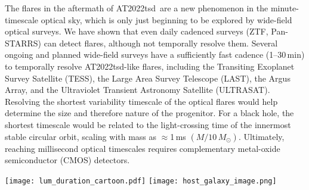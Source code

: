 \documentclass{nature_plusfigure}
\newcommand{\at}{AT2022tsd}
\begin{document}
The flares in the aftermath of \at\ are a new phenomenon in the minute-timescale optical sky, which is only just beginning to be explored by wide-field optical surveys\cite{Andreoni2020,Richmond2020}. %
We have shown that even daily cadenced surveys (ZTF, Pan-STARRS) can detect flares, although not temporally resolve them. Several ongoing and planned wide-field surveys have a sufficiently fast cadence (1--30\,min) to temporally resolve \at-like flares, including the Transiting Exoplanet Survey Satellite (TESS\cite{Ricker2015}), the Large Area Survey Telescope (LAST\cite{Nir2021,Ofek2023}), the Argus Array\cite{Law2022}, and the Ultraviolet Transient Astronomy Satellite (ULTRASAT\cite{Shvartzvald2023}). %
Resolving the shortest variability timescale of the optical flares would help determine the size and therefore nature of the progenitor.
For a black hole, the shortest timescale would be related to the light-crossing time of the innermost stable circular orbit, scaling with mass as $\approx$1\,ms $(M/10\,M_{\odot})$. Ultimately, reaching millisecond optical timescales requires complementary metal-oxide semiconductor (CMOS) detectors\cite{Nir2021}.


\newpage

\begin{figure*}
\centering
    \texttt{[image: lum\_duration\_cartoon.pdf]}
    \texttt{[image: host\_galaxy\_image.png]}
\caption{\textbf{\at\ is a luminous fast blue optical transient (LFBOT) showing flares with unprecedented timescales.}
\emph{Top:} Duration above half-maximum light ($t_{1/2}$) vs. peak absolute magnitude $M$ (or peak luminosity $\nu L_\nu$) of \at, its flares, and other extragalactic optical transients.
\emph{Bottom:} Keck/LRIS false-color $u/g/I$ image centred at the position of \at, which is marked.
See Methods section~\ref{sec:data-transient-parameter-space} for additional details and data sources.
}
 \label{fig:transient-parameter-space}
\end{figure*}
\end{document}
